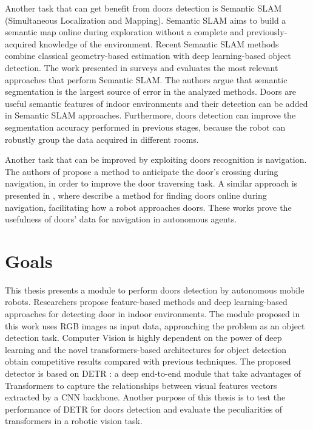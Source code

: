 Another task that can get benefit from doors detection is Semantic SLAM (Simultaneous Localization and Mapping). Semantic SLAM aims to build a semantic map online during exploration without a complete and previously-acquired knowledge of the environment. Recent Semantic SLAM methods combine classical geometry-based estimation with deep learning-based object detection. The work presented in \cite{semanticslamsurvey} surveys and evaluates the most relevant approaches that perform Semantic SLAM. The authors argue that semantic segmentation is the largest source of error in the analyzed methods. Doors are useful semantic features of indoor environments and their detection can be added in Semantic SLAM approaches. Furthermore, doors detection can improve the segmentation accuracy performed in previous stages, because the robot can robustly group the data acquired in different rooms. 

Another task that can be improved by exploiting doors recognition is navigation. The authors of \cite{sonarandivisualdoordetection} propose a method to anticipate the door's crossing during navigation, in order to improve the door traversing task. A similar approach is presented in \cite{doorsandnavigation}, where \citeauthor{doorsandnavigation} describe a method for finding doors online during navigation, facilitating how a robot approaches doors. These works prove the usefulness of doors' data for navigation in autonomous agents.

\section{Goals}

This thesis presents a module to perform doors detection by autonomous mobile robots. Researchers propose feature-based methods \cite{sonarandivisualdoordetection, humanoid, edgeandcornerdoorsdetector} and deep learning-based approaches \cite{detectdoorsfeature, doorsandnavigation, doorcabinet} for detecting door in indoor environments.  The module proposed in this work uses RGB images as input data, approaching the problem as an object detection task. Computer Vision is highly dependent on the power of deep learning and the novel transformers-based architectures for object detection obtain competitive results compared with previous techniques. The proposed detector is based on DETR \cite{detr}: a deep end-to-end module that take advantages of Transformers to capture the relationships between visual features vectors extracted by a CNN backbone. Another purpose of this thesis is to test the performance of DETR for doors detection and evaluate the peculiarities of transformers in a robotic vision task.

